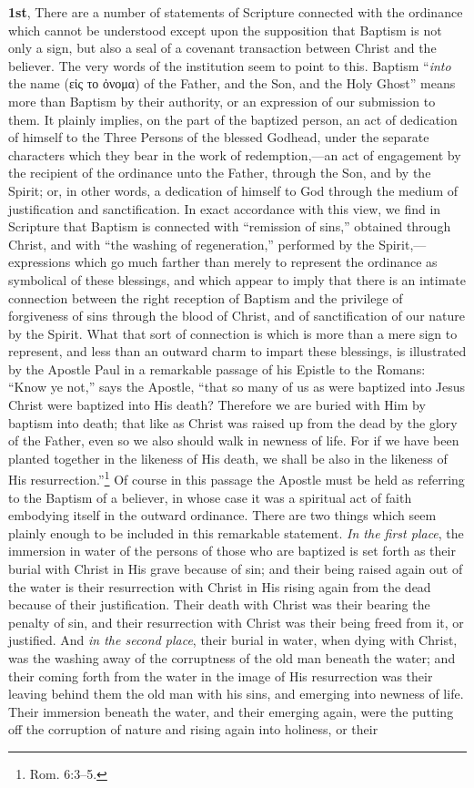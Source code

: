 \documentclass[
]{book}
\begin{document}
\textbf{1st}, There are a number of statements of Scripture connected with the ordinance which cannot be understood except upon the supposition that Baptism is not only a sign, but also a seal of a covenant transaction between Christ and the believer. The very words of the institution seem to point to this. Baptism ``\emph{into} the name (\foreignlanguage{greek}{εἰς το ὀνομα}) of the Father, and the Son, and the Holy Ghost'' means more than Baptism by their authority, or an expression of our submission to them. It plainly implies, on the part of the baptized person, an act of dedication of himself to the Three Persons of the blessed Godhead, under the separate characters which they bear in the work of redemption,---an act of engagement by the recipient of the ordinance unto the Father, through the Son, and by the Spirit; or, in other words, a dedication of himself to God through the medium of justification and sanctification. In exact accordance with this view, we find in Scripture that Baptism is connected with ``remission of sins,'' obtained through Christ, and with ``the washing of regeneration,'' performed by the Spirit,---expressions which go much farther than merely to represent the ordinance as symbolical of these blessings, and which appear to imply that there is an intimate connection between the right reception of Baptism and the privilege of forgiveness of sins through the blood of Christ, and of sanctification of our nature by the Spirit. What that sort of connection is which is more than a mere sign to represent, and less than an outward charm to impart these blessings, is illustrated by the Apostle Paul in a remarkable passage of his Epistle to the Romans: ``Know ye not,'' says the Apostle, ``that so many of us as were baptized into Jesus Christ were baptized into His death? Therefore we are buried with Him by baptism into death; that like as Christ was raised up from the dead by the glory of the Father, even so we also should walk in newness of life. For if we have been planted together in the likeness of His death, we shall be also in the likeness of His resurrection.''\footnote{Rom. 6:3--5.} Of course in this passage the Apostle must be held as referring to the Baptism of a believer, in whose case it was a spiritual act of faith embodying itself in the outward ordinance. There are two things which seem plainly enough to be included in this remarkable statement. \emph{In the first place}, the immersion in water of the persons of those who are baptized is set forth as their burial with Christ in His grave because of sin; and their being raised again out of the water is their resurrection with Christ in His rising again from the dead because of their justification. Their death with Christ was their bearing the penalty of sin, and their resurrection with Christ was their being freed from it, or justified. And \emph{in the second place}, their burial in water, when dying with Christ, was the washing away of the corruptness of the old man beneath the water; and their coming forth from the water in the image of His resurrection was their leaving behind them the old man with his sins, and emerging into newness of life. Their immersion beneath the water, and their emerging again, were the putting off the corruption of nature and rising again into holiness, or their 
\end{document}
